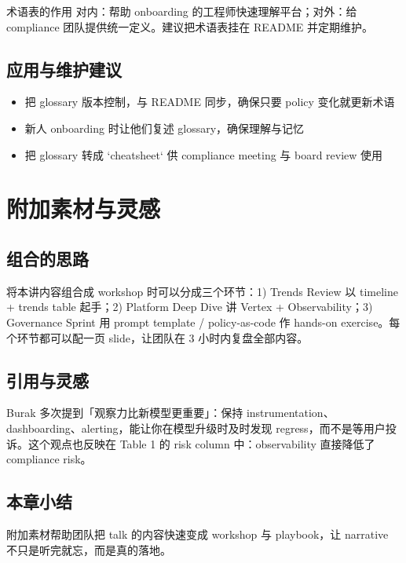 \documentclass[a4paper]{article}
\begin{document}
\begin{importantbox}{术语表的作用}
对内：帮助 onboarding 的工程师快速理解平台；对外：给 compliance 团队提供统一定义。建议把术语表挂在 README 并定期维护。
\end{importantbox}

\subsection{应用与维护建议}

\begin{itemize}
    \item 把 glossary 版本控制，与 README 同步，确保只要 policy 变化就更新术语
    \item 新人 onboarding 时让他们复述 glossary，确保理解与记忆
    \item 把 glossary 转成 `cheatsheet` 供 compliance meeting 与 board review 使用
\end{itemize}

\section{附加素材与灵感}

\subsection{组合的思路}

将本讲内容组合成 workshop 时可以分成三个环节：1) Trends Review 以 timeline + trends table 起手；2) Platform Deep Dive 讲 Vertex + Observability；3) Governance Sprint 用 prompt template / policy-as-code 作 hands-on exercise。每个环节都可以配一页 slide，让团队在 3 小时内复盘全部内容。

\subsection{引用与灵感}

Burak 多次提到「观察力比新模型更重要」：保持 instrumentation、dashboarding、alerting，能让你在模型升级时及时发现 regress，而不是等用户投诉。这个观点也反映在 Table 1 的 risk column 中：observability 直接降低了 compliance risk。

\subsection{本章小结}

附加素材帮助团队把 talk 的内容快速变成 workshop 与 playbook，让 narrative 不只是听完就忘，而是真的落地。
\end{document}
